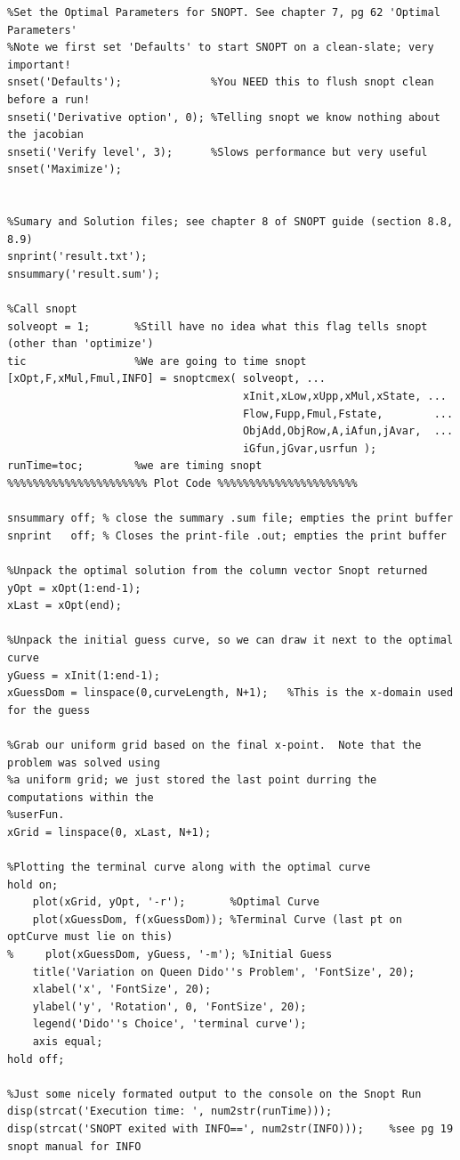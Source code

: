 \documentclass[10pt]{article}
\begin{document}
{{\begin{verbatim}
%Set the Optimal Parameters for SNOPT. See chapter 7, pg 62 'Optimal Parameters'
%Note we first set 'Defaults' to start SNOPT on a clean-slate; very important!
snset('Defaults');              %You NEED this to flush snopt clean before a run!
snseti('Derivative option', 0); %Telling snopt we know nothing about the jacobian
snseti('Verify level', 3);      %Slows performance but very useful
snset('Maximize');


%Sumary and Solution files; see chapter 8 of SNOPT guide (section 8.8, 8.9)
snprint('result.txt');
snsummary('result.sum');

%Call snopt
solveopt = 1;       %Still have no idea what this flag tells snopt (other than 'optimize')
tic                 %We are going to time snopt
[xOpt,F,xMul,Fmul,INFO] = snoptcmex( solveopt, ...
				                     xInit,xLow,xUpp,xMul,xState, ...
				                     Flow,Fupp,Fmul,Fstate,        ...
				                     ObjAdd,ObjRow,A,iAfun,jAvar,  ...
				                     iGfun,jGvar,usrfun );
runTime=toc;        %we are timing snopt
%%%%%%%%%%%%%%%%%%%%%% Plot Code %%%%%%%%%%%%%%%%%%%%%%

snsummary off; % close the summary .sum file; empties the print buffer
snprint   off; % Closes the print-file .out; empties the print buffer

%Unpack the optimal solution from the column vector Snopt returned
yOpt = xOpt(1:end-1);
xLast = xOpt(end);

%Unpack the initial guess curve, so we can draw it next to the optimal curve
yGuess = xInit(1:end-1);
xGuessDom = linspace(0,curveLength, N+1);   %This is the x-domain used for the guess

%Grab our uniform grid based on the final x-point.  Note that the problem was solved using
%a uniform grid; we just stored the last point durring the computations within the
%userFun.
xGrid = linspace(0, xLast, N+1);

%Plotting the terminal curve along with the optimal curve
hold on;
    plot(xGrid, yOpt, '-r');       %Optimal Curve
    plot(xGuessDom, f(xGuessDom)); %Terminal Curve (last pt on optCurve must lie on this)
%     plot(xGuessDom, yGuess, '-m'); %Initial Guess
    title('Variation on Queen Dido''s Problem', 'FontSize', 20);
    xlabel('x', 'FontSize', 20);
    ylabel('y', 'Rotation', 0, 'FontSize', 20);
    legend('Dido''s Choice', 'terminal curve');
    axis equal;
hold off;

%Just some nicely formated output to the console on the Snopt Run
disp(strcat('Execution time: ', num2str(runTime)));
disp(strcat('SNOPT exited with INFO==', num2str(INFO)));    %see pg 19 snopt manual for INFO


\end{verbatim}}}
\end{document}
